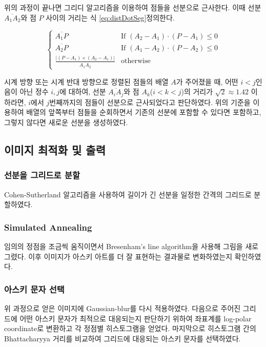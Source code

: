 \documentclass[conference]{IEEEtran}
\begin{document}
\indent 위의 과정이 끝나면 그리디 알고리즘을 이용하여 점들을 선분으로 근사한다.
이때 선분$\overline{A_1A_2}$와 점 $P$ 사이의 거리는 식 \ref{eq:distDotSeg}\로 정의한다.

\begin{equation}
    \begin{cases}
        \overline{A_1P} & \text{If } (A_2 - A_1) \cdot (P - A_1) \leq 0 \\
        \overline{A_2P} & \text{If } (A_1 - A_2) \cdot (P - A_2) \leq 0 \\
        \frac{|(P - A_1)\times (A_2 - A_1)|}{\overline{A_1A_2}} & \text{otherwise}
    \end{cases}
    \label{eq:distDotSeg}
\end{equation}

\indent 시계 방향 또는 시계 반대 방향으로 정렬된 점들의 배열 $A$가 주어졌을 때, 어떤 $i < j$인 음이 아닌 정수 $i, j$에 대하여,
선분 $\overline{A_iA_j}$와 점 $A_k$($i < k < j$)의 거리가 $\sqrt 2 \approx 1.42$ 이하라면, $i$에서 $j$번째까지의 점들이 선분으로 근사되었다고 판단하였다.
위의 기준을 이용하여 배열의 앞쪽부터 점들을 순회하면서 기존의 선분에 포함할 수 있다면 포함하고, 그렇지 않다면 새로운 선분을 생성하였다.

\subsection{이미지 최적화 및 출력}

\subsubsection{선분을 그리드로 분할}

Cohen-Sutherland 알고리즘\cite{cohen-sutherland}을 사용하여 길이가 긴 선분을 일정한 간격의 그리드로 분할하였다.

\subsubsection{Simulated Annealing}

임의의 정점을 조금씩 움직이면서 Bresenham's line algorithm\cite{bresenham-line}을 사용해 그림을 새로 그렸다.
이후 이미지가 아스키 아트를 더 잘 표현하는 결과물로 변화하였는지 확인하였다.

\subsubsection{아스키 문자 선택}

위 과정으로 얻은 이미지에 Gaussian-blur를 다시 적용하였다.
다음으로 주어진 그리드에 어떤 아스키 문자가 최적으로 대응되는지 판단하기 위하여 좌표계를 log-polar coordinate로 변환하고 각 정점별 히스토그램을 얻었다.\cite{log-polar}
마지막으로 히스토그램 간의 Bhattacharyya 거리를 비교하여 그리드에 대응되는 아스키 문자를 선택하였다.\cite{st-ba-ascii-art}\cite{bhattacharyya}
\end{document}
